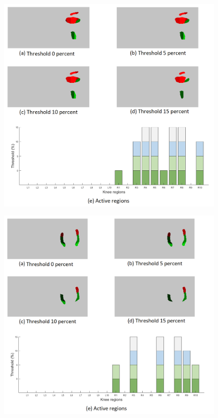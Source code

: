 \begin{figure} [H]
\centering
\includegraphics[width=1\textwidth]{figures/threshold125}
\end{figure}

\begin{figure} [H]
\centering
\includegraphics[width=1\textwidth]{figures/threshold206}
\end{figure}
